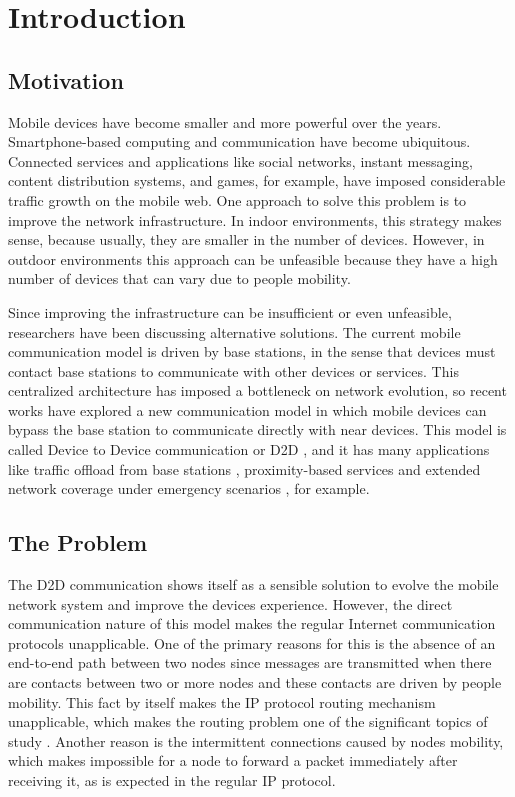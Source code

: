 \chapter{Introduction}
\label{ch:Introduction}

\section{Motivation}
\label{sec:intro.motivation}

Mobile devices have become smaller and more powerful over the years. Smartphone-based computing and communication have become ubiquitous.
Connected services and applications like social networks, instant messaging, content distribution systems, and games, for example, have imposed considerable traffic growth on the mobile web. One approach to solve this problem is to improve the network infrastructure. In indoor environments, this strategy makes sense, because usually, they are smaller in the number of devices. However, in outdoor environments this approach can be unfeasible because they have a high number of devices that can vary due to people mobility.

Since improving the infrastructure can be insufficient or even unfeasible, researchers have been discussing alternative solutions. The current mobile communication model is driven by base stations, in the sense that devices must contact base stations to communicate with other devices or services. This centralized architecture has imposed a bottleneck on network evolution, so recent works have explored a new communication model in which mobile devices can bypass the base station to communicate directly with near devices. This model is called Device to Device communication or D2D \citep{yang2013solving}, and it has many applications like traffic offload from base stations \citep*{yang2013solving, nunes2016leveraging, aijaz2013survey, pyattaev2013proximity, andreev2014cellular, bastug2014living}, proximity-based services \citep{lin2014overview} and extended network coverage under emergency scenarios \citep{babun2015multi}, for example.

\section{The Problem}
\label{sec:intro.problemStatement}

The D2D communication shows itself as a sensible solution to evolve the mobile network system and improve the devices experience. However, the direct communication nature of this model makes the regular Internet communication protocols unapplicable. One of the primary reasons for this is the absence of an end-to-end path between two nodes since messages are transmitted when there are contacts between two or more nodes and these contacts are driven by people mobility. This fact by itself makes the IP protocol routing mechanism unapplicable, which makes the routing problem one of the significant topics of study \citep{misra2016opportunistic}. Another reason is the intermittent connections caused by nodes mobility, which makes impossible for a node to forward a packet immediately after receiving it, as is expected in the regular IP protocol.

